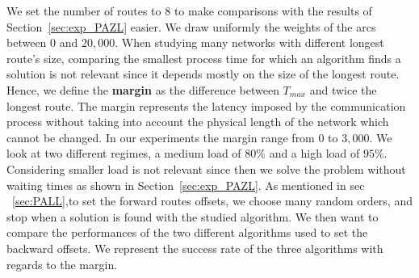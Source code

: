 \documentclass[10pt, conference, letterpaper]{IEEEtran}
\newcommand{\todo}[1]{{\color{red} TODO: {#1}}}
\newcommand\pazl{\textsc{pazl}\xspace}
\newcommand\pall{\textsc{pall}\xspace}
\begin{document}
    We set the number of routes to $8$ to make comparisons with the results of Section~\ref{sec:exp_PAZL} easier. 
    We draw uniformly the weights of the arcs between $0$ and $20,000$. When studying many networks with different longest route's size, comparing the smallest process time for which an algorithm finds a solution is not relevant since it depends mostly on the size of the longest route. Hence, we define the {\bf margin} as the difference between $T_{max}$ and twice the longest route. The margin represents the latency imposed by the communication process without taking into account the physical length of the network which cannot be changed. In our experiments the margin range from  $0$ to $3,000$.
   We look at two different regimes, a medium load of $80\%$ and a high load of $95\%$.
   Considering smaller load is not relevant since then we solve the problem without waiting times as shown in Section~\ref{sec:exp_PAZL}. 
%   
%
%     
%
%     
%     
%     
As mentioned in sec ~\ref{sec:PALL},to set the forward routes offsets, we choose many random orders, and stop when a solution is found with the studied algorithm. 
      We then want to compare the performances of the two different algorithms used to set the backward offsets. We represent the success rate of the three algorithms with regards to the margin.
     
\end{document}
